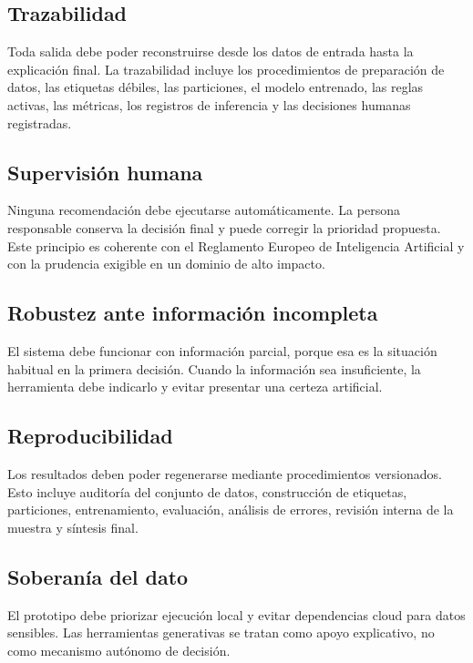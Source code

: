 \subsection{Trazabilidad}

Toda salida debe poder reconstruirse desde los datos de entrada hasta la explicación final. La trazabilidad incluye los procedimientos de preparación de datos, las etiquetas débiles, las particiones, el modelo entrenado, las reglas activas, las métricas, los registros de inferencia y las decisiones humanas registradas.

\subsection{Supervisión humana}

Ninguna recomendación debe ejecutarse automáticamente. La persona responsable conserva la decisión final y puede corregir la prioridad propuesta. Este principio es coherente con el Reglamento Europeo de Inteligencia Artificial \cite{EUAIAct2024} y con la prudencia exigible en un dominio de alto impacto.

\subsection{Robustez ante información incompleta}

El sistema debe funcionar con información parcial, porque esa es la situación habitual en la primera decisión. Cuando la información sea insuficiente, la herramienta debe indicarlo y evitar presentar una certeza artificial.

\subsection{Reproducibilidad}

Los resultados deben poder regenerarse mediante procedimientos versionados. Esto incluye auditoría del conjunto de datos, construcción de etiquetas, particiones, entrenamiento, evaluación, análisis de errores, revisión interna de la muestra y síntesis final.

\subsection{Soberanía del dato}

El prototipo debe priorizar ejecución local y evitar dependencias cloud para datos sensibles. Las herramientas generativas se tratan como apoyo explicativo, no como mecanismo autónomo de decisión.

